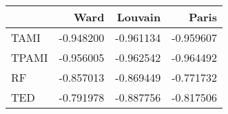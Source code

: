 \begin{tabular}{lrrr}
\toprule
{} &      Ward &   Louvain &     Paris \\
\midrule
TAMI  & -0.948200 & -0.961134 & -0.959607 \\
TPAMI & -0.956005 & -0.962542 & -0.964492 \\
RF    & -0.857013 & -0.869449 & -0.771732 \\
TED   & -0.791978 & -0.887756 & -0.817506 \\
\bottomrule
\end{tabular}
